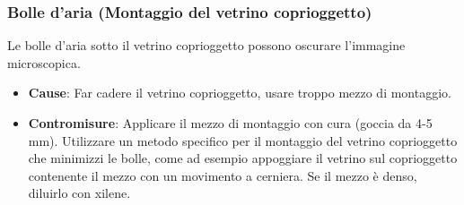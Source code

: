 
\subsubsection{Bolle d'aria (Montaggio del vetrino coprioggetto)}
Le bolle d'aria sotto il vetrino coprioggetto possono oscurare l'immagine microscopica. 
\begin{itemize}
    \item   \textbf{Cause}: Far cadere il vetrino coprioggetto, usare troppo mezzo di montaggio. 
    \item   \textbf{Contromisure}: Applicare il mezzo di montaggio con cura (goccia da 4-5 mm).  Utilizzare un metodo specifico per il montaggio del vetrino coprioggetto che minimizzi le bolle, come ad esempio appoggiare il vetrino sul coprioggetto contenente il mezzo con un movimento a cerniera.  Se il mezzo è denso, diluirlo con xilene.
\end{itemize}

